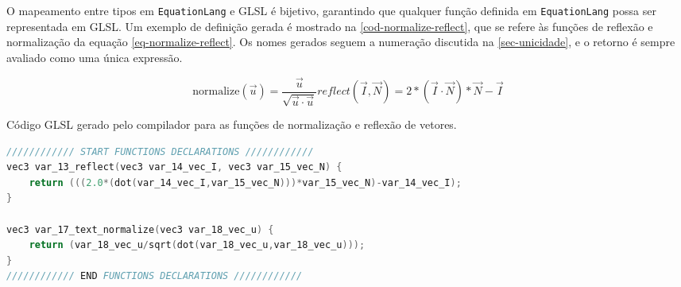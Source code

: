 O mapeamento entre tipos em \texttt{EquationLang} e GLSL é bijetivo, garantindo que qualquer função definida em \texttt{EquationLang} possa ser representada em GLSL. Um exemplo de definição gerada é mostrado na \autoref{cod-normalize-reflect}, que se refere às funções de reflexão e normalização da equação \autoref{eq-normalize-reflect}. Os nomes gerados seguem a numeração discutida na \autoref{sec-unicidade}, e o retorno é sempre avaliado como uma única expressão.


\label{eq-normalize-reflect} \begin{subequations}
\begin{equation}
  \text{normalize}(\vec{u}) = \frac{\vec{u}}{\sqrt{\vec{u} \cdot \vec{u}}}
\end{equation}

\begin{equation}
reflect(\vec I, \vec N) =  2*(\vec I \cdot \vec N)*\vec N - \vec I
\end{equation}
\end{subequations}

\begin{codigo}[htb]
   \caption{\small Código GLSL gerado pelo compilador para as funções de normalização e reflexão de vetores. }
   \label{cod-normalize-reflect}
\begin{lstlisting}[language=C, inputencoding=utf8]
//////////// START FUNCTIONS DECLARATIONS ////////////
vec3 var_13_reflect(vec3 var_14_vec_I, vec3 var_15_vec_N) {
    return (((2.0*(dot(var_14_vec_I,var_15_vec_N)))*var_15_vec_N)-var_14_vec_I);
}

vec3 var_17_text_normalize(vec3 var_18_vec_u) {
    return (var_18_vec_u/sqrt(dot(var_18_vec_u,var_18_vec_u)));
}
//////////// END FUNCTIONS DECLARATIONS ////////////

\end{lstlisting}
\end{codigo}
